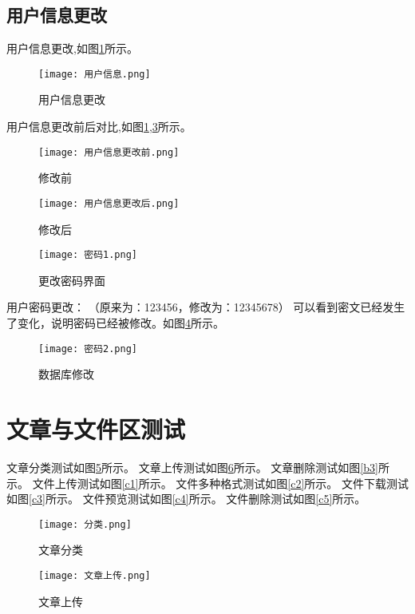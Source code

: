 \documentclass[bachelor]{thesis-uestc}
\begin{document}
\subsection{用户信息更改}
用户信息更改,如图\ref{a1}所示。
\begin{figure}[htbp]
    \centering
    \texttt{[image: 用户信息.png]}
    \caption{用户信息更改}
    \label{a1}
\end{figure}

用户信息更改前后对比,如图\ref{a1},\ref{a3}所示。
\begin{figure}[htbp]
    \centering
    \texttt{[image: 用户信息更改前.png]}
    \caption{修改前}
    \label{a2}
    
    \vspace{1em} %
    \texttt{[image: 用户信息更改后.png]}
    \caption*{修改后} %
\end{figure}


\begin{figure}[htbp]
    \centering
    \texttt{[image: 密码1.png]}
    \caption{更改密码界面}
    \label{a3}
\end{figure}
用户密码更改：
（原来为：123456，修改为：12345678）
可以看到密文已经发生了变化，说明密码已经被修改。如图\ref{a4}所示。
\begin{figure}[htbp]
    \centering
    \texttt{[image: 密码2.png]}
    \caption{数据库修改}
    \label{a4}
\end{figure}

\section{文章与文件区测试}
文章分类测试如图\ref{b1}所示。
文章上传测试如图\ref{b2}所示。
文章删除测试如图\ref{b3}所示。
文件上传测试如图\ref{c1}所示。
文件多种格式测试如图\ref{c2}所示。
文件下载测试如图\ref{c3}所示。
文件预览测试如图\ref{c4}所示。
文件删除测试如图\ref{c5}所示。

\begin{figure}[htbp]
    \centering
    \texttt{[image: 分类.png]}
    \caption{文章分类}
    \label{b1}
\end{figure}


\begin{figure}[htbp]
    \centering
    \texttt{[image: 文章上传.png]}
    \caption{文章上传}
    \label{b2}
\end{figure}
\end{document}
